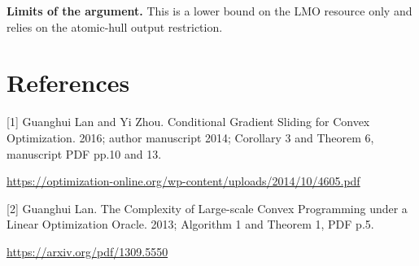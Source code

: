 \documentclass[10pt,a4paper]{article}
\begin{document}
\textbf{Limits of the argument.} This is a lower bound on the LMO resource only and relies on the atomic-hull output restriction.

\section{References}
[1] Guanghui Lan and Yi Zhou. Conditional Gradient Sliding for Convex Optimization. 2016; author manuscript 2014; Corollary 3 and Theorem 6, manuscript PDF pp.10 and 13.

\url{https://optimization-online.org/wp-content/uploads/2014/10/4605.pdf}

[2] Guanghui Lan. The Complexity of Large-scale Convex Programming under a Linear Optimization Oracle. 2013; Algorithm 1 and Theorem 1, PDF p.5.

\url{https://arxiv.org/pdf/1309.5550}
\end{document}
